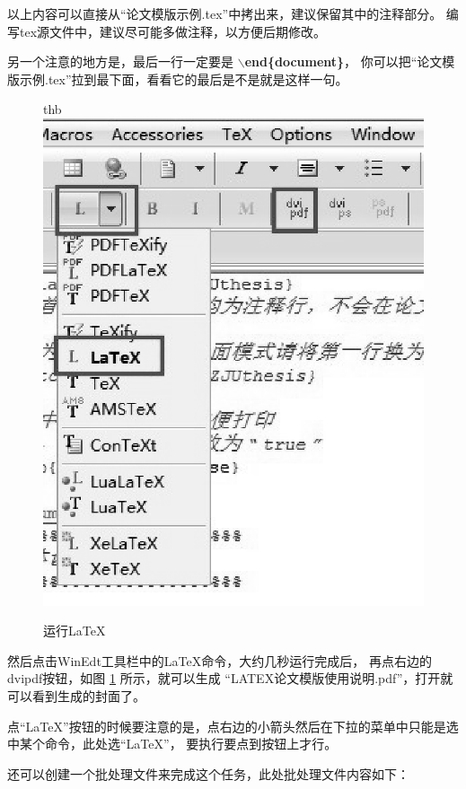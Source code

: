 以上内容可以直接从“论文模版示例.tex”中拷出来，建议保留其中的注释部分。
编写tex源文件中，建议尽可能多做注释，以方便后期修改。

另一个注意的地方是，最后一行一定要是 {\bf$\backslash$end\{document\}}，
你可以把“论文模版示例.tex”拉到最下面，看看它的最后是不是就是这样一句。

\begin{figure}{thb}
\centering
\includegraphics[scale=0.8]{./Pictures/runLaTeX.eps}
\caption{运行LaTeX}
\label{runLaTeX}
\end{figure}

然后点击WinEdt工具栏中的LaTeX命令，大约几秒运行完成后，
再点右边的dvipdf按钮，如图 \ref{runLaTeX} 所示，就可以生成
“LATEX论文模版使用说明.pdf”，打开就可以看到生成的封面了。

点“LaTeX”按钮的时候要注意的是，点右边的小箭头然后在下拉的菜单中只能是选中某个命令，此处选“LaTeX”，
要执行要点到按钮上才行。

还可以创建一个批处理文件来完成这个任务，此处批处理文件内容如下：

